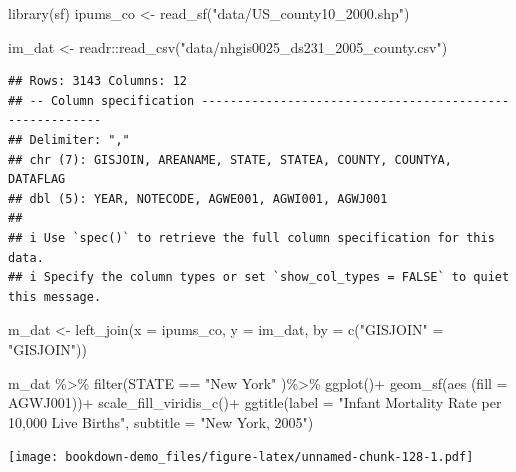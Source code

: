 \documentclass[
]{article}
\newenvironment{Shaded}{\begin{snugshade}}{\end{snugshade}}
\newcommand{\AttributeTok}[1]{\textcolor[rgb]{0.77,0.63,0.00}{#1}}
\newcommand{\FunctionTok}[1]{\textcolor[rgb]{0.00,0.00,0.00}{#1}}
\newcommand{\NormalTok}[1]{#1}
\newcommand{\OtherTok}[1]{\textcolor[rgb]{0.56,0.35,0.01}{#1}}
\newcommand{\SpecialCharTok}[1]{\textcolor[rgb]{0.00,0.00,0.00}{#1}}
\newcommand{\StringTok}[1]{\textcolor[rgb]{0.31,0.60,0.02}{#1}}
\begin{document}
\begin{Shaded}
\begin{Highlighting}[]
\FunctionTok{library}\NormalTok{(sf)}
\NormalTok{ipums\_co }\OtherTok{\textless{}{-}} \FunctionTok{read\_sf}\NormalTok{(}\StringTok{"data/US\_county10\_2000.shp"}\NormalTok{)}


\NormalTok{im\_dat }\OtherTok{\textless{}{-}}\NormalTok{ readr}\SpecialCharTok{::}\FunctionTok{read\_csv}\NormalTok{(}\StringTok{"data/nhgis0025\_ds231\_2005\_county.csv"}\NormalTok{)}
\end{Highlighting}
\end{Shaded}

\begin{verbatim}
## Rows: 3143 Columns: 12
## -- Column specification --------------------------------------------------------
## Delimiter: ","
## chr (7): GISJOIN, AREANAME, STATE, STATEA, COUNTY, COUNTYA, DATAFLAG
## dbl (5): YEAR, NOTECODE, AGWE001, AGWI001, AGWJ001
## 
## i Use `spec()` to retrieve the full column specification for this data.
## i Specify the column types or set `show_col_types = FALSE` to quiet this message.
\end{verbatim}

\begin{Shaded}
\begin{Highlighting}[]
\NormalTok{m\_dat }\OtherTok{\textless{}{-}} \FunctionTok{left\_join}\NormalTok{(}\AttributeTok{x =}\NormalTok{ ipums\_co,}
                   \AttributeTok{y =}\NormalTok{ im\_dat,}
                   \AttributeTok{by =} \FunctionTok{c}\NormalTok{(}\StringTok{"GISJOIN"} \OtherTok{=} \StringTok{"GISJOIN"}\NormalTok{))}

\NormalTok{m\_dat }\SpecialCharTok{\%\textgreater{}\%}
  \FunctionTok{filter}\NormalTok{(STATE }\SpecialCharTok{==} \StringTok{"New York"}\NormalTok{ )}\SpecialCharTok{\%\textgreater{}\%}
  \FunctionTok{ggplot}\NormalTok{()}\SpecialCharTok{+}
  \FunctionTok{geom\_sf}\NormalTok{(}\FunctionTok{aes}\NormalTok{ (}\AttributeTok{fill =}\NormalTok{ AGWJ001))}\SpecialCharTok{+}
  \FunctionTok{scale\_fill\_viridis\_c}\NormalTok{()}\SpecialCharTok{+}
  \FunctionTok{ggtitle}\NormalTok{(}\AttributeTok{label =} \StringTok{"Infant Mortality Rate per 10,000 Live Births"}\NormalTok{,}
          \AttributeTok{subtitle =} \StringTok{"New York, 2005"}\NormalTok{)}
\end{Highlighting}
\end{Shaded}

\texttt{[image: bookdown-demo\_files/figure-latex/unnamed-chunk-128-1.pdf]}
\end{document}
